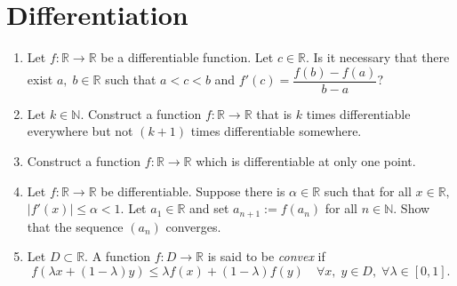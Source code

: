\documentclass{article}
\begin{document}
\section{Differentiation}
\begin{enumerate} 
	\item Let $f:\mathbb{R}\to\mathbb{R}$ be a differentiable function. Let $c \in \mathbb{R}.$ Is it necessary that there exist $a,\;b \in \mathbb{R}$ such that $a < c < b$ and $f'(c) = \dfrac{f(b) - f(a)}{b - a}?$
	\item Let $k\in \mathbb{N}.$ Construct a function $f:\mathbb{R}\to\mathbb{R}$ that is $k$ times differentiable everywhere but not $(k+1)$ times differentiable somewhere.
	\item Construct a function $f:\mathbb{R}\to\mathbb{R}$ which is differentiable at only one point.
	\item Let $f:\mathbb{R}\to\mathbb{R}$ be differentiable. Suppose there is $\alpha \in \mathbb{R}$ such that for all $x \in \mathbb{R},$ $|f'(x)| \le \alpha < 1.$ Let $a_1 \in \mathbb{R}$ and set $a_{n+1} := f(a_n)$ for all $n \in \mathbb{N}.$ Show that the sequence $(a_n)$ converges.
	\item Let $D \subset \mathbb{R}.$ A function $f:D\to \mathbb{R}$ is said to be \emph{convex} if
	\[f(\lambda x + (1 - \lambda)y) \le \lambda f(x) + (1 - \lambda)f(y) \quad \forall x,\;y\in D,\;\forall \lambda\in [0, 1].\]
	

\end{enumerate}
\end{document}

